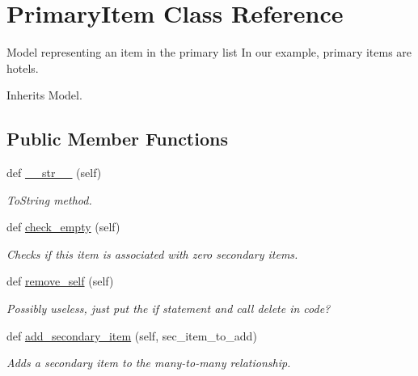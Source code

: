 \hypertarget{classjoinapp_1_1models_1_1items_1_1_primary_item}{}\section{Primary\+Item Class Reference}
\label{classjoinapp_1_1models_1_1items_1_1_primary_item}


Model representing an item in the primary list In our example, primary items are hotels.  




Inherits Model.

\subsection*{Public Member Functions}
\begin{DoxyCompactItemize}
\item 
def \mbox{\hyperlink{classjoinapp_1_1models_1_1items_1_1_primary_item_a23e8041ce1015febe4fdace3225714f9}{\+\_\+\+\_\+str\+\_\+\+\_\+}} (self)
\begin{DoxyCompactList}\small\item\em To\+String method. \end{DoxyCompactList}\item 
def \mbox{\hyperlink{classjoinapp_1_1models_1_1items_1_1_primary_item_a2c3ae2e498290b3837d39fd123eeb1d3}{check\+\_\+empty}} (self)
\begin{DoxyCompactList}\small\item\em Checks if this item is associated with zero secondary items. \end{DoxyCompactList}\item 
def \mbox{\hyperlink{classjoinapp_1_1models_1_1items_1_1_primary_item_af433a8dae46e760513860737f65c09c0}{remove\+\_\+self}} (self)
\begin{DoxyCompactList}\small\item\em Possibly useless, just put the if statement and call delete in code? \end{DoxyCompactList}\item 
def \mbox{\hyperlink{classjoinapp_1_1models_1_1items_1_1_primary_item_abb811d3b5d38292739bb5f35f664ccb7}{add\+\_\+secondary\+\_\+item}} (self, sec\+\_\+item\+\_\+to\+\_\+add)
\begin{DoxyCompactList}\small\item\em Adds a secondary item to the many-\/to-\/many relationship. \end{DoxyCompactList}\end{DoxyCompactItemize}
